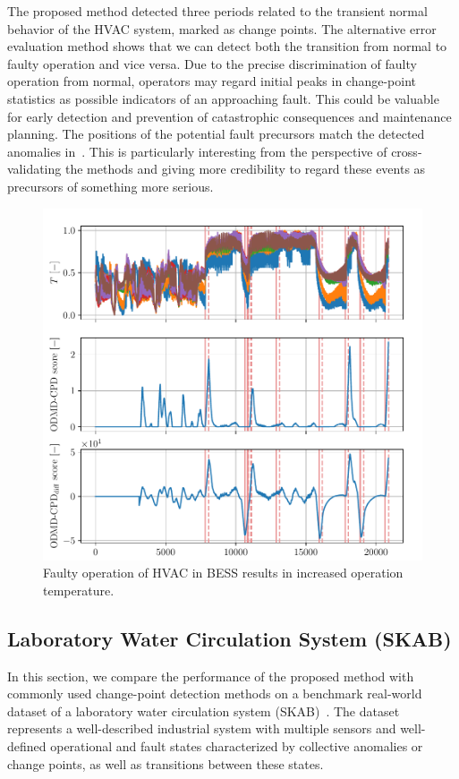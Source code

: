 The proposed method detected three periods related to the transient normal behavior of the HVAC system, marked as change points. The alternative error evaluation method shows that we can detect both the transition from normal to faulty operation and vice versa. Due to the precise discrimination of faulty operation from normal, operators may regard initial peaks in change-point statistics as possible indicators of an approaching fault. This could be valuable for early detection and prevention of catastrophic consequences and maintenance planning. The positions of the potential fault precursors match the detected anomalies in~\citet{Wadinger2024}. This is particularly interesting from the perspective of cross-validating the methods and giving more credibility to regard these events as precursors of something more serious.

\begin{figure}
    \centering
    \includegraphics[width=\linewidth]{figures/bess-chd_p10-l2880_b240_t240roll_2880-dmd_w1.0-hx20.pdf}
    \caption{Faulty operation of HVAC in BESS results in increased operation temperature.}\label{fig:bess}
\end{figure}


\subsection{Laboratory Water Circulation System (SKAB)}
In this section, we compare the performance of the proposed method with commonly used change-point detection methods on a benchmark real-world dataset of a laboratory water circulation system (SKAB)~\citep{Katser2020}. The dataset represents a well-described industrial system with multiple sensors and well-defined operational and fault states characterized by collective anomalies or change points, as well as transitions between these states.

